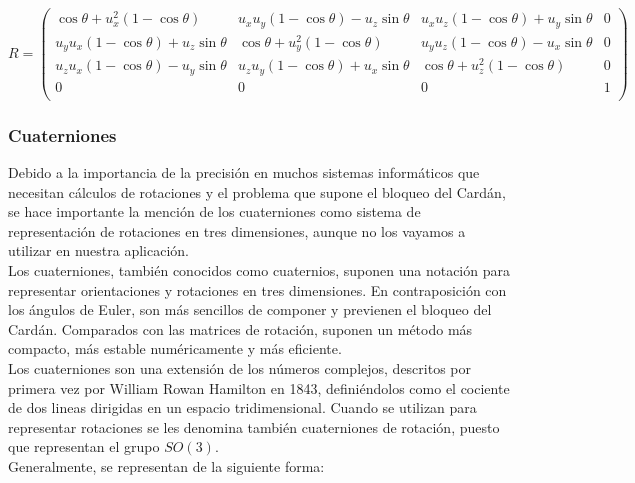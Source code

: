 \begin{equation}
		R = 
		\left(
				\begin{array}{cccc}
						\cos\theta + u_x^2(1-\cos\theta) &
						u_xu_y(1-\cos\theta)-u_z\sin\theta &
						u_xu_z(1-\cos\theta)+u_y\sin\theta & 0 \\

						u_yu_x(1-\cos\theta)+u_z\sin\theta & \cos\theta +
						u_y^2(1-\cos\theta) &
						u_yu_z(1-\cos\theta)-u_x\sin\theta & 0 \\

						u_zu_x(1-\cos\theta)-u_y\sin\theta &
						u_zu_y(1-\cos\theta) + u_x\sin\theta & \cos\theta +
						u_z^2(1-\cos\theta) & 0 \\

						0 & 0 & 0 & 1 \\
				\end{array}
		\right)
\end{equation}

\subsubsection{Cuaterniones}
\label{makereference5.4.2.2}

Debido a la importancia de la precisión en muchos sistemas informáticos que
necesitan cálculos de rotaciones y el problema que supone el bloqueo del Cardán,
se hace importante la mención de los cuaterniones como sistema de representación
de rotaciones en tres dimensiones, aunque no los vayamos a utilizar en nuestra
aplicación. \\

Los cuaterniones, también conocidos como cuaternios, suponen una notación para
representar orientaciones y rotaciones en tres dimensiones. En contraposición
con los ángulos de Euler, son más sencillos de componer y previenen el bloqueo
del Cardán. Comparados con las matrices de rotación, suponen un método más
compacto, más estable numéricamente y más eficiente. \\

Los cuaterniones son una extensión de los números complejos, descritos por
primera vez por William Rowan Hamilton en 1843, definiéndolos como el cociente
de dos lineas dirigidas en un espacio tridimensional.  Cuando se utilizan para
representar rotaciones se les denomina también cuaterniones de rotación, puesto
que representan el grupo $SO(3)$. \\

Generalmente, se representan de la siguiente forma:

